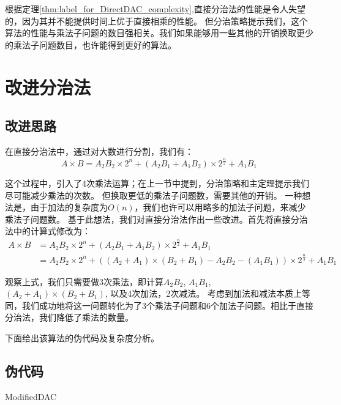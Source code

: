 根据定理\ref{thm:label_for_DirectDAC_complexity},直接分治法的性能是令人失望的，因为其并不能提供时间上优于直接相乘的性能。
但分治策略提示我们，这个算法的性能与乘法子问题的数目强相关。我们如果能够用一些其他的开销换取更少的乘法子问题数目，也许能得到更好的算法。


\newpage
\section{改进分治法}
\subsection{改进思路}
在直接分治法中，通过对大数进行分割，我们有：
\begin{displaymath}
	A \times B = A_2 B_2 \times 2^n + (A_2 B_1 + A_1 B_2) \times 2^{\frac{n}{2}} + A_1 B_1
\end{displaymath}

这个过程中，引入了4次乘法运算；在上一节中提到，分治策略和主定理提示我们尽可能减少乘法的次数。
但换取更低的乘法子问题数，需要其他的开销。
一种想法是，由于加法的复杂度为$O(n)$，我们也许可以用略多的加法子问题，来减少乘法子问题数。
基于此想法，我们对直接分治法作出一些改进。首先将直接分治法中的计算式修改为：
\begin{displaymath}
	\begin{split}
		A \times B
		&= A_2 B_2 \times 2^n + (A_2 B_1 + A_1 B_2) \times 2^{\frac{n}{2}} + A_1 B_1\\
		&= A_2 B_2 \times 2^n + ((A_2 + A_1)\times(B_2 + B_1) - A_2 B_2 - (A_1 B_1)) \times 2^{\frac{n}{2}} + A_1 B_1
	\end{split}
\end{displaymath}

观察上式，我们只需要做3次乘法，即计算$A_2 B_2$, $A_1 B_1$, $(A_2 + A_1)\times(B_2 + B_1)$, 以及4次加法，2次减法。
考虑到加法和减法本质上等同，我们成功地将这一问题转化为了3个乘法子问题和6个加法子问题。相比于直接分治法，我们降低了乘法的数量。

下面给出该算法的伪代码及复杂度分析。
\subsection{伪代码}
\begin{algorithm}
	\DontPrintSemicolon{}
	\caption{ModifiedDAC\label{label_for_pseudo_ModifiedDAC}}
\end{algorithm}

